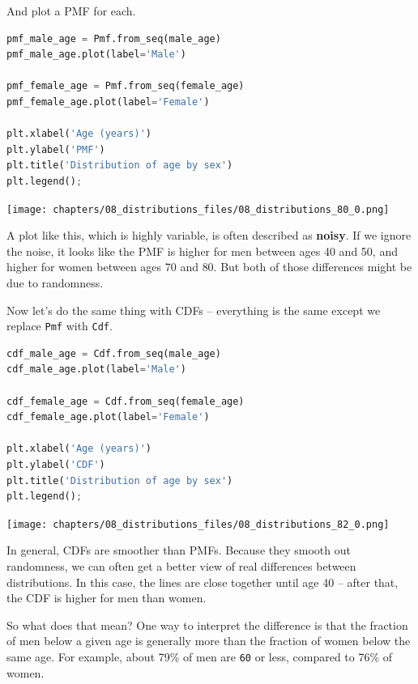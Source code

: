 And plot a PMF for each.

\begin{lstlisting}[language=Python,style=source]
pmf_male_age = Pmf.from_seq(male_age)
pmf_male_age.plot(label='Male')

pmf_female_age = Pmf.from_seq(female_age)
pmf_female_age.plot(label='Female')

plt.xlabel('Age (years)') 
plt.ylabel('PMF')
plt.title('Distribution of age by sex')
plt.legend();
\end{lstlisting}

\begin{center}
\texttt{[image: chapters/08\_distributions\_files/08\_distributions\_80\_0.png]}
\end{center}

A plot like this, which is highly variable, is often described as
\textbf{noisy}. If we ignore the noise, it looks like the PMF is higher
for men between ages 40 and 50, and higher for women between ages 70 and
80. But both of those differences might be due to randomness.

Now let's do the same thing with CDFs -- everything is the same except
we replace \passthrough{\lstinline!Pmf!} with
\passthrough{\lstinline!Cdf!}.

\begin{lstlisting}[language=Python,style=source]
cdf_male_age = Cdf.from_seq(male_age)
cdf_male_age.plot(label='Male')

cdf_female_age = Cdf.from_seq(female_age)
cdf_female_age.plot(label='Female')

plt.xlabel('Age (years)') 
plt.ylabel('CDF')
plt.title('Distribution of age by sex')
plt.legend();
\end{lstlisting}

\begin{center}
\texttt{[image: chapters/08\_distributions\_files/08\_distributions\_82\_0.png]}
\end{center}

In general, CDFs are smoother than PMFs. Because they smooth out
randomness, we can often get a better view of real differences between
distributions. In this case, the lines are close together until age 40
-- after that, the CDF is higher for men than women.

So what does that mean? One way to interpret the difference is that the
fraction of men below a given age is generally more than the fraction of
women below the same age. For example, about 79\% of men are
\passthrough{\lstinline!60!} or less, compared to 76\% of women.

